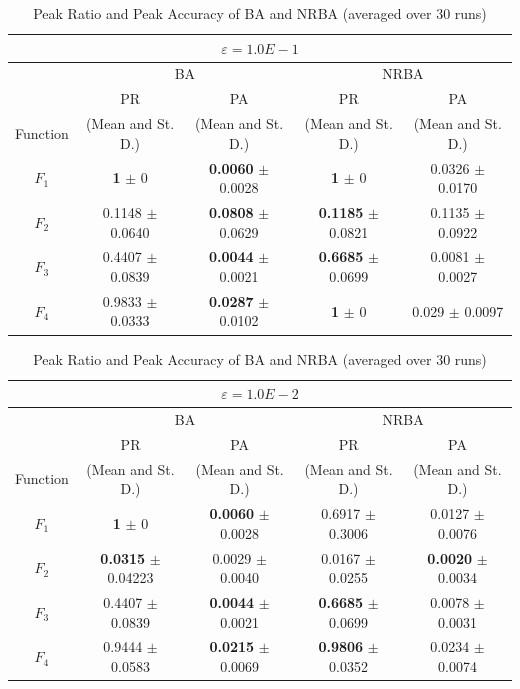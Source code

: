 \documentclass[conference]{IEEEtran}
\begin{document}
\begin{table}[h]
\caption{Peak Ratio and Peak Accuracy of BA and NRBA (averaged over 30 runs)}
\begin{center}
\begin{tabular}{c|c|c|c|c}
\multicolumn{5}{c}{$\varepsilon = 1.0E-1$} \\
\hline
\multicolumn{1}{c|}{} & \multicolumn{2}{c|}{BA} & \multicolumn{2}{c}{NRBA} \\
\hline
 & PR & PA & PR & PA \\

Function & (Mean and St. D.) & (Mean and St. D.) & (Mean and St. D.) & (Mean and St. D.) \\
\hline
$F_1 $ & {\bf 1} $\pm$ 0 & {\bf 0.0060} $\pm$ 0.0028 & {\bf 1} $\pm$ 0 & 0.0326 $\pm$ 0.0170  \\
\hline
$F_2 $ & 0.1148 $\pm$ 0.0640 & {\bf 0.0808} $\pm$ 0.0629 & {\bf 0.1185} $\pm$ 0.0821 & 0.1135 $\pm$ 0.0922 \\
\hline
$F_3 $ &  0.4407 $\pm$ 0.0839 & {\bf 0.0044} $\pm$ 0.0021 & {\bf 0.6685} $\pm$ 0.0699 & 0.0081 $\pm$ 0.0027\\
\hline
$F_4 $ & 0.9833 $\pm$ 0.0333 & {\bf 0.0287} $\pm$ 0.0102 & {\bf 1} $\pm$ 0 & 0.029 $\pm$ 0.0097 \\
\hline
\end{tabular}
\label{tab3}
\end{center}
\end{table}

\begin{table}[h]
\caption{Peak Ratio and Peak Accuracy of BA and NRBA (averaged over 30 runs)}
\begin{center}
\begin{tabular}{c|c|c|c|c}
\multicolumn{5}{c}{$\varepsilon = 1.0E-2$} \\
\hline
\multicolumn{1}{c|}{} & \multicolumn{2}{c|}{BA} & \multicolumn{2}{c}{NRBA} \\
\hline
 & PR & PA & PR & PA \\

Function & (Mean and St. D.) & (Mean and St. D.) & (Mean and St. D.) & (Mean and St. D.) \\
\hline
$F_1 $ & {\bf 1} $\pm$ 0 & {\bf 0.0060} $\pm$ 0.0028 & 0.6917 $\pm$ 0.3006 & 0.0127 $\pm$ 0.0076  \\
\hline
$F_2 $ & {\bf 0.0315} $\pm$ 0.04223 & 0.0029 $\pm$ 0.0040 & 0.0167 $\pm$ 0.0255 & {\bf 0.0020} $\pm$ 0.0034 \\
\hline
$F_3 $ & 0.4407 $\pm$ 0.0839 & {\bf 0.0044} $\pm$ 0.0021 & {\bf 0.6685} $\pm$ 0.0699 & 0.0078 $\pm$ 0.0031 \\
\hline
$F_4 $ & 0.9444 $\pm$ 0.0583 & {\bf 0.0215} $\pm$ 0.0069 & {\bf 0.9806} $\pm$ 0.0352 & 0.0234 $\pm$ 0.0074 \\
\hline
\end{tabular}
\label{tab4}
\end{center}
\end{table}
\end{document}
